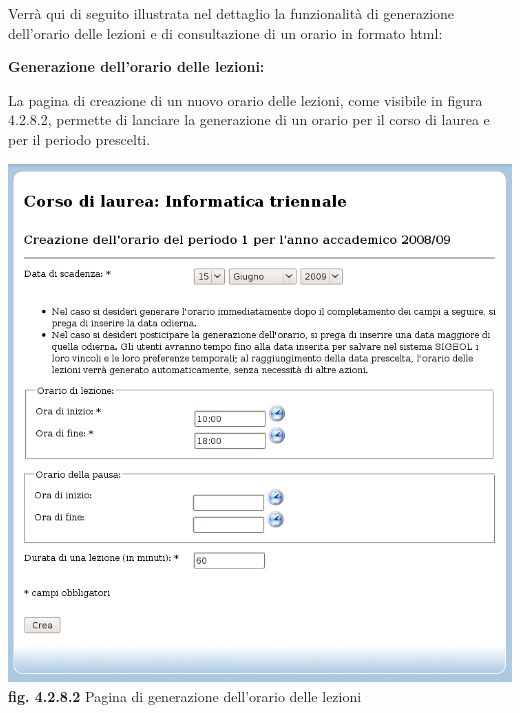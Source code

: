 \documentclass[11pt,a4paper]{article}
\begin{document}
Verrà qui di seguito illustrata nel dettaglio la funzionalità di generazione dell'orario delle lezioni e di consultazione di un orario in formato html:
\newline \newline
\begin{large}\textbf{Generazione dell'orario delle lezioni:}\end{large}
\newline \newline
La pagina di creazione di un nuovo orario delle lezioni, come visibile in figura 4.2.8.2, permette di lanciare la generazione di un orario per il corso di laurea e per il periodo prescelti.
\bigskip
\begin{center}
	\includegraphics[scale=0.5]{images/generazione_orario.jpg}\\
	\textbf{fig. 4.2.8.2} Pagina di generazione dell'orario delle lezioni\\
\end{center}
\bigskip
\end{document}
